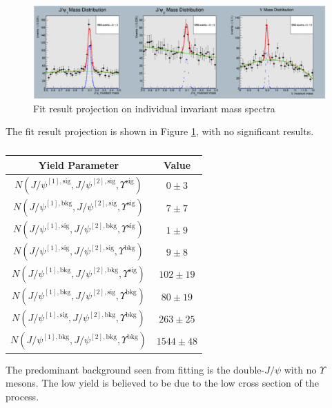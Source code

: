 \documentclass[10pt,twocolumn]{article}
\begin{document}
\begin{figure}
    \centering
    \includegraphics[width=1.0\linewidth]{images/JpsiJpsiY_fit.png}
    \caption{Fit result projection on individual invariant mass spectra}
    \label{fig:JpsiJpsiY_fit}
\end{figure}

The fit result projection is shown in Figure  \ref{fig:JpsiJpsiY_fit}, with no significant results.

\begin{table}[]
    \centering
    \caption{}
    \begin{tabular}{cc}
        \toprule
        \textbf{Yield Parameter} & \textbf{Value} \\
        \midrule
        $N(J/\psi^{[1], \text{sig} },J/\psi^{[2],\text{sig} }, \Upsilon^\text{sig})$ & $0 \pm 3$ \\
        $N(J/\psi^{[1], \text{bkg} },J/\psi^{[2],\text{sig} }, \Upsilon^\text{sig})$ & $7 \pm 7$ \\
        $N(J/\psi^{[1], \text{sig} },J/\psi^{[2],\text{bkg} }, \Upsilon^\text{sig})$ & $1 \pm 9$ \\
        $N(J/\psi^{[1], \text{sig} },J/\psi^{[2],\text{sig} }, \Upsilon^\text{bkg})$ & $9 \pm 8$ \\
        $N(J/\psi^{[1], \text{bkg} },J/\psi^{[2],\text{bkg} }, \Upsilon^\text{sig})$ & $102 \pm 19$ \\
        $N(J/\psi^{[1], \text{bkg} },J/\psi^{[2],\text{sig} }, \Upsilon^\text{bkg})$ & $80 \pm 19$ \\
        $N(J/\psi^{[1], \text{sig} },J/\psi^{[2],\text{bkg} }, \Upsilon^\text{bkg})$ & $263 \pm 25$ \\
        $N(J/\psi^{[1], \text{bkg} },J/\psi^{[2],\text{bkg} }, \Upsilon^\text{bkg})$ & $1544 \pm 48$ \\
        \bottomrule
    \end{tabular}
    \label{tab:my_label}
\end{table}

The predominant background seen from fitting is the double-$J/\psi$ with no $\Upsilon$ mesons. The low yield is believed to be due to the low cross section of the process.
\end{document}
